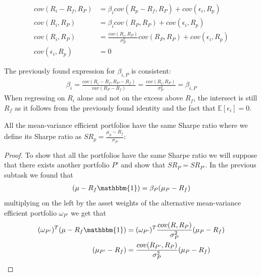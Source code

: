 \documentclass[10pt]{article}
\newcommand{\Ebb}{\mathbb{E}}
\newenvironment{exercise}[2][Exercise]{\begin{trivlist}
  \item[\hskip \labelsep {\bfseries #1}\hskip \labelsep {\bfseries #2.}]}{\end{trivlist}}
\newenvironment{proposition}[2][Proposition]{\begin{trivlist}
  \item[\hskip \labelsep {\bfseries #1}\hskip \labelsep {\bfseries #2.}]}{\end{trivlist}}
\begin{document}
\begin{exercise}{1}
\begin{itemize}
            \begin{align*}
              cov(R_i - R_f, R_P) &= \beta_icov(R_p - R_f, R_P) + cov(\epsilon_i, R_p) \\
              cov(R_i, R_P) &= \beta_icov(R_P, R_P) + cov(\epsilon_i, R_p) \\
              cov(R_i, R_P) &= \frac{cov(R_i, R_P)}{\sigma_P^2}cov(R_P, R_P) + cov(\epsilon_i, R_p) \\
              cov(\epsilon_i, R_p) &= 0
            \end{align*}

            The previously found expression for $\beta_{i, P}$ is consistent:
            \begin{align*}
              \beta_{i} = \frac{cov(R_i - R_f, R_P - R_f)}{var(R_P - R_f)} = \frac{cov(R_i, R_P)}{\sigma_P^2} = \beta_{i, P}
              \end{align*}
              When regressing on $R_i$ alone and not on the excess above $R_f$, the intersect is still
              $R_f$ as it follows from the previously found identity and the
              fact that $\Ebb\left[ \epsilon_i \right] = 0$.
            \item
              \begin{proposition}{[Sharpe-Ratios]}
              All the mean-variance efficient portfolios have the same Sharpe
              ratio where we define its Sharpe ratio as $SR_p = \frac{\mu_p -
                R_f}{\sigma_P}$:
              \end{proposition}
              \begin{proof}
              To show that all the portfolios have the same Sharpe ratio we will
              suppose that there exists another portfolio $P'$ and show that
              $SR_P = SR_{P'}$.
              In the previous subtask we found that
              \begin{align*}
                (\mu - R_f \mathbbm{1}) = \beta_P(\mu_P - R_f)
              \end{align*}
              multiplying on the left by the asset weights of the alternative
              mean-variance efficient
              portfolio $\omega_{P'}$ we get that
              \begin{align}
                (\omega_{P'})^T(\mu - R_f \mathbbm{1}) &= (\omega_{P'})^T \frac{cov(R, R_P)}{\sigma_P^2} (\mu_P - R_f) \\
                \label{eq:twoportfolios}
                (\mu_{P'} - R_f) &= \frac{cov(R_{P'}, R_P)}{\sigma_P^2} (\mu_P - R_f)

\end{align}
\end{proof}
\end{itemize}
\end{exercise}
\end{document}

